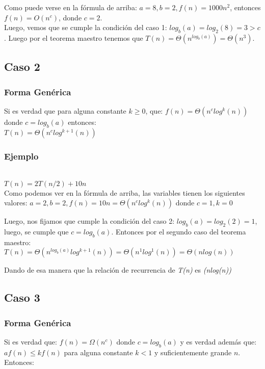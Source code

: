 \documentclass[12pt]{article}
\begin{document}
Como puede verse en la fórmula de arriba: $a=8 , b=2, f(n)=1000n^2$, entonces $f(n)=O(n^c)$, donde $c=2$.\\

Luego, vemos que se cumple la condición del caso 1: $log_{b}(a)=log_{2}(8)=3 > c$.
Luego por el teorema maestro tenemos que $T(n)=\Theta(n^{log_{b}(a)})=\Theta(n^3)$.

\subsection{Caso 2}
\subsubsection{Forma Genérica}
Si es verdad que para alguna constante $k\geq 0$, que: $f(n)=\Theta(n^c log^k(n))$ donde $c=log_{b}(a)$ entonces:\\

$T(n)=\Theta(n^c log^{k+1}(n))$

\subsubsection{Ejemplo}\\

$T(n)=2T(n/2)+10n$\\

Como podemos ver en la fórmula de arriba, las variables tienen los siguientes valores: $a=2 , b=2, f(n)=10n = \Theta(n^c log^k(n))$ donde $c=1, k=0$

Luego, nos fijamos que cumple la condición del caso 2: $log_{b}(a)=log_{2}(2)= 1$, luego, se cumple que $c=log_{b}(a)$.
Entonces por el segundo caso del teorema maestro: $T(n)=\Theta(n^{log_{b}(a)}log^{k+1}(n))=\Theta(n^1log^1(n))=\Theta(nlog(n))$

Dando de esa manera que la relación de recurrencia de \textit{T(n)} es \textit{\Theta(nlog(n))}

\subsection{Caso 3}
\subsubsection{Forma Genérica}
Si es verdad que: $f(n)=\Omega(n^c)$ donde $c=log_{b}(a)$ y es verdad además que: $af(n)\leq kf(n)$ para alguna constante $k < 1$ y suficientemente grande $n$. Entonces:\\
\end{document}
